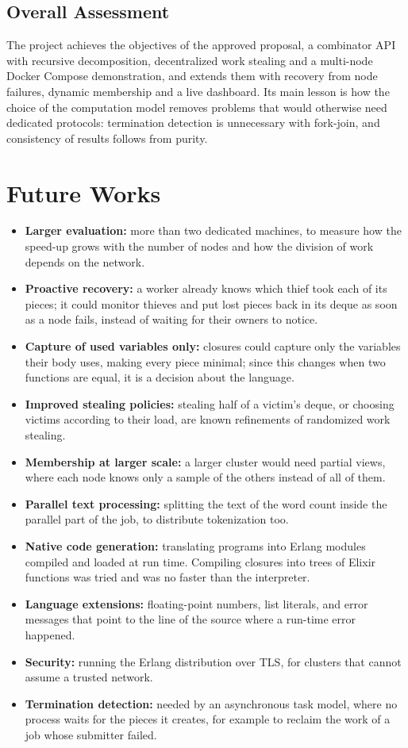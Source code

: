 \documentclass{scrartcl}
\begin{document}
\subsection{Overall Assessment}

The project achieves the objectives of the approved proposal, a combinator API with recursive decomposition, decentralized work stealing and a multi-node Docker Compose demonstration, and extends them with recovery from node failures, dynamic membership and a live dashboard.
%
Its main lesson is how the choice of the computation model removes problems that would otherwise need dedicated protocols: termination detection is unnecessary with fork-join, and consistency of results follows from purity.

\section{Future Works}\label{future-works}

\begin{itemize}
  \item \textbf{Larger evaluation:} more than two dedicated machines, to measure how the speed-up grows with the number of nodes and how the division of work depends on the network.
  \item \textbf{Proactive recovery:} a worker already knows which thief took each of its pieces; it could monitor thieves and put lost pieces back in its deque as soon as a node fails, instead of waiting for their owners to notice.
  \item \textbf{Capture of used variables only:} closures could capture only the variables their body uses, making every piece minimal; since this changes when two functions are equal, it is a decision about the language.
  \item \textbf{Improved stealing policies:} stealing half of a victim's deque, or choosing victims according to their load, are known refinements of randomized work stealing.
  \item \textbf{Membership at larger scale:} a larger cluster would need partial views, where each node knows only a sample of the others instead of all of them.
  \item \textbf{Parallel text processing:} splitting the text of the word count inside the parallel part of the job, to distribute tokenization too.
  \item \textbf{Native code generation:} translating programs into Erlang modules compiled and loaded at run time. Compiling closures into trees of Elixir functions was tried and was no faster than the interpreter.
  \item \textbf{Language extensions:} floating-point numbers, list literals, and error messages that point to the line of the source where a run-time error happened.
  \item \textbf{Security:} running the Erlang distribution over TLS, for clusters that cannot assume a trusted network.
  \item \textbf{Termination detection:} needed by an asynchronous task model, where no process waits for the pieces it creates, for example to reclaim the work of a job whose submitter failed.
\end{itemize}

{\small


}
\end{document}

